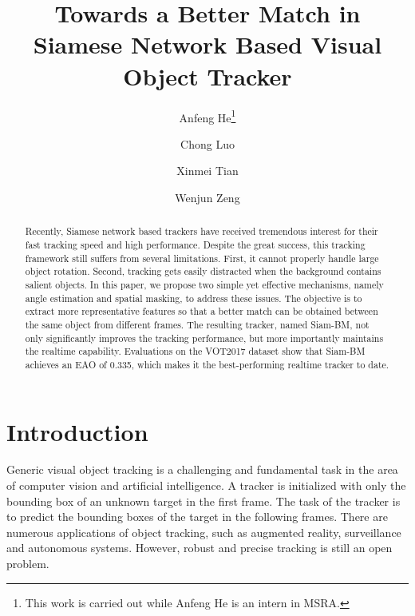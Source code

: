 \documentclass[runningheads]{llncs}
\begin{document}
\title{Towards a Better Match in Siamese Network Based Visual Object Tracker} 


\author{Anfeng He\thanks{This work is carried out while Anfeng He is an intern in MSRA.} \and
        Chong Luo \and
        Xinmei Tian \and
        Wenjun Zeng
       }


\maketitle              \begin{abstract}
Recently, Siamese network based trackers have received tremendous interest for their fast tracking speed and high performance. Despite the great success, this tracking framework still suffers from several limitations. First, it cannot properly handle large object rotation. Second, tracking gets easily distracted when the background contains salient objects. In this paper, we propose two simple yet effective mechanisms, namely angle estimation and spatial masking, to address these issues. The objective is to extract more representative features so that a better match can be obtained between the same object from different frames. The resulting tracker, named Siam-BM, not only significantly improves the tracking performance, but more importantly maintains the realtime capability. Evaluations on the VOT2017 dataset show that Siam-BM achieves an EAO of 0.335, which makes it the best-performing realtime tracker to date.  

\end{abstract}
\section{Introduction}
    
Generic visual object tracking is a challenging and fundamental task in the area of computer vision and artificial intelligence. A tracker is initialized with only the bounding box of an unknown target in the first frame. The task of the tracker is to predict the bounding boxes of the target in the following frames. There are numerous applications of object tracking, such as augmented reality, surveillance and autonomous systems. However, robust and precise tracking is still an open problem. 
    
\end{document}
